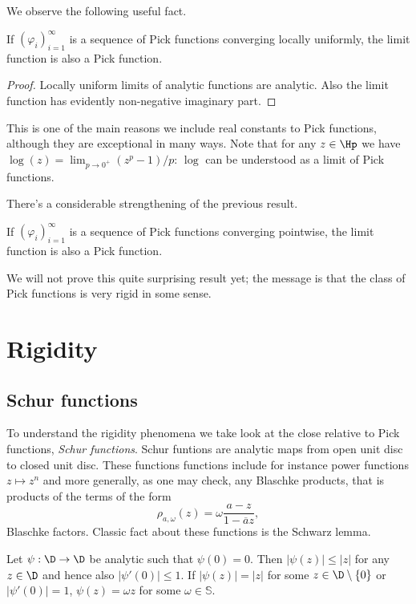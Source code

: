 We observe the following useful fact.

\begin{prop}
	If $(\varphi_{i})_{i = 1}^{\infty}$ is a sequence of Pick functions converging locally uniformly, the limit function is also a Pick function.
\end{prop}
\begin{proof}
	Locally uniform limits of analytic functions are analytic. Also the limit function has evidently non-negative imaginary part.
\end{proof}

This is one of the main reasons we include real constants to Pick functions, although they are exceptional in many ways. Note that for any $z \in \Hp$ we have $\log(z) = \lim_{p \to 0^{+}}(z^p - 1)/p$: $\log$ can be understood as a limit of Pick functions.

There's a considerable strengthening of the previous result.

\begin{prop}\label{pick_convergence}
	If $(\varphi_{i})_{i = 1}^{\infty}$ is a sequence of Pick functions converging pointwise, the limit function is also a Pick function.
\end{prop}

We will not prove this quite surprising result yet; the message is that the class of Pick functions is very rigid in some sense.

\section{Rigidity}

\subsection{Schur functions}

To understand the rigidity phenomena we take look at the close relative to Pick functions, \textit{Schur functions}. Schur funtions are analytic maps from open unit disc to closed unit disc. These functions functions include for instance power functions $z \mapsto z^{n}$ and more generally, as one may check, any Blaschke products, that is products of the terms of the form
\[
	\rho_{a, \omega}(z) = \omega \frac{a - z}{1 - \overline{a} z},
\]
Blaschke factors. Classic fact about these functions is the Schwarz lemma.

\begin{lause}
	Let $\psi : \D \to \D$ be analytic such that $\psi(0) = 0$. Then $|\psi(z)| \leq |z|$ for any $z \in \D$ and hence also $|\psi'(0)| \leq 1$. If $|\psi(z)| = |z|$ for some $z \in \D \setminus \{0\}$ or $|\psi'(0)| = 1$, $\psi(z) = \omega z$ for some $\omega \in \mathbb{S}$.
\end{lause}

